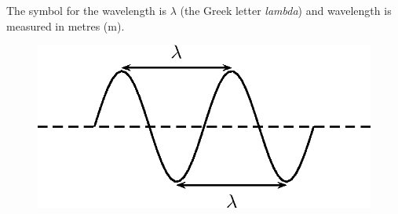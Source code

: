         \label{m38806*id318708}The symbol for the wavelength is $\lambda $ (the Greek letter \textsl{lambda}) and wavelength is measured in metres ($\mathrm{m}$).\par 
        \label{m38806*id318725}
    \setcounter{subfigure}{0}
	\begin{figure}[H] %
    \begin{center}
    \label{m38806*id318728!!!underscore!!!media}\label{m38806*id318728!!!underscore!!!printimage}\includegraphics[width=0.5\columnwidth]{col11305.imgs/m38806_PG10C5_008.png} %
      \vspace{2pt}
    \vspace{.1in}
    \end{center}
 \end{figure}       
        \par 
\label{m38806*secfhsst!!!underscore!!!id280}\vspace{.5cm} 
      \noindent

